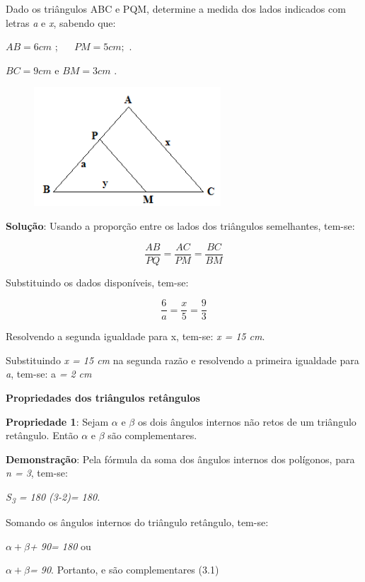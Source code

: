 \begin{texemplo}
\begin{multicols}{2}
Dado os triângulos ABC e PQM, determine a medida dos \tab lados indicados com letras \textit{a} e \textit{x}, \tab sabendo que:

 \( AB=6 cm \) ; \( ~~~~~~  PM=5 cm; \)     .\tab \tab 

 \( BC=9 cm \)    e   \( BM=3 cm \) .

\begin{figure}[H]
    \begin{Center}
        \includegraphics[width=2.75in,height=1.75in]{capitulos/trigonometria_e_funcoes_trigonometricas/media/image11.png}
    \end{Center}
\end{figure}

\end{multicols}
\textbf{Solução}: Usando a proporção entre os lados dos triângulos semelhantes, tem-se:

 \[ \frac{AB}{PQ}=\frac{AC}{PM}=\frac{BC}{BM} \]

Substituindo os dados disponíveis, tem-se:

 \[ \frac{6}{a}=\frac{x}{5}=\frac{9}{3} \]

Resolvendo a segunda igualdade para x, tem-se:  \textit{x = 15 cm}.

Substituindo \textit{x = 15 cm}  na segunda razão e resolvendo a primeira igualdade para \textit{a}, tem-se: a\textit{ = 2 cm} \textit{\qedsymbol}
\end{texemplo}

\textbf{Propriedades dos triângulos retângulos}

\begin{caixa}
\textbf{Propriedade 1}: Sejam $\alpha$ e $\beta$  os dois ângulos internos não retos de um triângulo retângulo. Então  $\alpha$ e $\beta$  são complementares.

\textbf{Demonstração}: Pela fórmula da soma dos ângulos internos dos polígonos, para \textit{n = 3}, tem-se:

\textit{S\textsubscript{3} = 180 (3-2)= 180\degree .}

Somando os ângulos internos do triângulo retângulo, tem-se:

$\alpha + \beta$\textit{+ 90\degree = 180\degree}  ou

$\alpha + \beta$\textit{= 90\degree}. Portanto,  e  são complementares \qedsymbol \tab (3.1)
\end{caixa}


